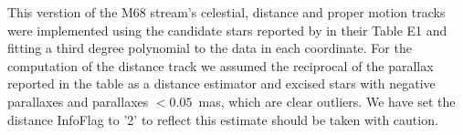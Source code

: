 This verstion of the M68 stream's celestial, distance and proper motion tracks were implemented using the candidate stars reported by \citet{Palau2019} in their Table E1 and fitting a third degree polynomial to the data in each coordinate. For the computation of the distance track we assumed the reciprocal of the parallax reported in the table as a distance estimator and excised stars with negative parallaxes and parallaxes $<0.05$~mas, which are clear outliers. We have set the distance InfoFlag to '2' to reflect this estimate should be taken with caution.
